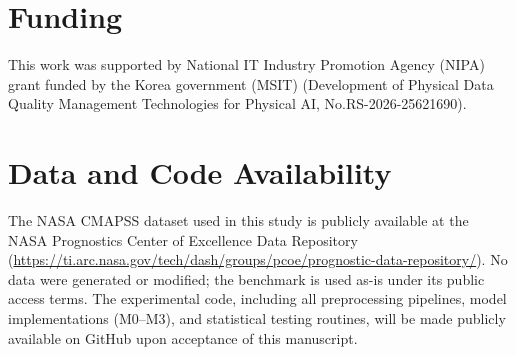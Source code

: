 \documentclass[review,12pt]{elsarticle}
\begin{document}
\section*{Funding}

This work was supported by National IT Industry Promotion Agency (NIPA) grant funded by the Korea government (MSIT) (Development of Physical Data Quality Management Technologies for Physical AI, No.RS-2026-25621690).

\section{Data and Code Availability}

The NASA CMAPSS dataset used in this study is publicly available at the NASA Prognostics Center of Excellence Data Repository (\url{https://ti.arc.nasa.gov/tech/dash/groups/pcoe/prognostic-data-repository/}). No data were generated or modified; the benchmark is used as-is under its public access terms. The experimental code, including all preprocessing pipelines, model implementations (M0–M3), and statistical testing routines, will be made publicly available on GitHub upon acceptance of this manuscript.
\end{document}
